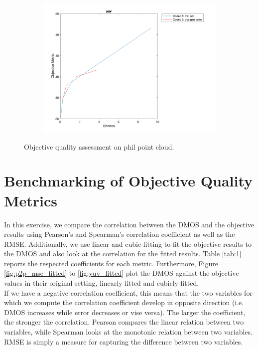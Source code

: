 \documentclass{article}
\begin{document}
\begin{figure}
    \begin{subfigure}[b]{0.65\textwidth}
    \includegraphics[width=\textwidth]{Figures/task2/rhetorician_yuv.png}
    \end{subfigure}
    \caption{Objective quality assessment on \textsf{phil} point cloud.}
    \label{fig:obj_rhetorician}
\end{figure}


\section{Benchmarking of Objective Quality Metrics}
In this exercise, we compare the correlation between the DMOS and the objective results using Pearson's and Spearman's correlation coefficient as well as the RMSE.
Additionally, we use linear and cubic fitting to fit the objective results to the DMOS and also look at the correlation for the fitted results. Table \ref{tab:1} reports the respected coefficients for each metric. Furthermore, Figure \ref{fig:p2p_mse_fitted} to \ref{fig:yuv_fitted} plot the DMOS against the objective values in their original setting, linearly fitted and cubicly fitted. \\

If we have a negative correlation coefficient, this means that the two variables for which we compute the correlation coefficient develop in opposite direction (i.e. DMOS increases while error decreases or vise versa). The larger the coefficient, the stronger the correlation. Pearson compares the linear relation between two variables, while Spearman looks at the monotonic relation between two variables. RMSE is simply a measure for capturing the difference between two variables. \\
\end{document}
